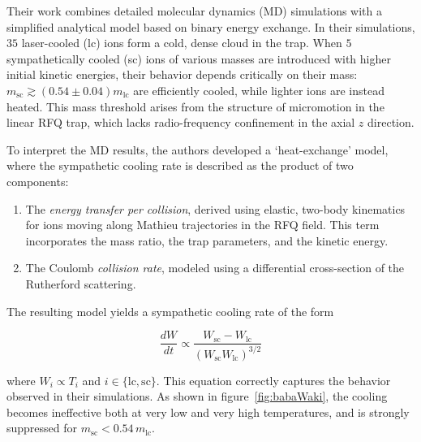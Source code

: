 Their work combines detailed molecular dynamics (MD) simulations with a simplified analytical model based on binary energy exchange. In their simulations, $35$ laser-cooled (lc)  ions form a cold, dense cloud in the trap. When $5$ sympathetically cooled (sc) ions of various masses are introduced with higher initial kinetic energies, their behavior depends critically on their mass: $m_\mathrm{sc} \gtrsim (0.54 \pm 0.04) m_\mathrm{lc}$ are efficiently cooled, while lighter ions are instead heated. This mass threshold arises from the structure of micromotion in the linear RFQ trap, which lacks radio-frequency confinement in the axial $z$ direction.

To interpret the MD results, the authors developed a `heat-exchange' model, where the sympathetic cooling rate is described as the product of two components:

\begin{enumerate}
    \item The \emph{energy transfer per collision}, derived using elastic, two-body kinematics for ions moving along Mathieu trajectories in the RFQ field. This term incorporates the mass ratio, the trap parameters, and the kinetic energy.
    \item The Coulomb \emph{collision rate}, modeled using a differential cross-section of the Rutherford scattering.
\end{enumerate}

The resulting model yields a sympathetic cooling rate of the form

$$ \frac{dW}{dt} \propto \frac{W_\mathrm{sc} - W_\mathrm{lc}}{(W_\mathrm{sc} W_\mathrm{lc})^{3/2}} $$

where $W_i \propto T_i$ and $i \in \{\mathrm{lc}, \mathrm{sc}\}$. This equation correctly captures the behavior observed in their simulations. As shown in figure~\ref{fig:babaWaki}, the cooling becomes ineffective both at very low and very high temperatures, and is strongly suppressed for $m_\mathrm{sc} < 0.54\,m_\mathrm{lc}$.

